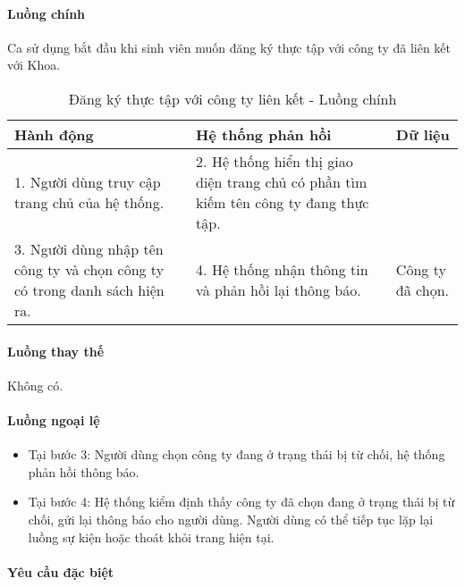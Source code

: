 \documentclass[./../main.tex]{subfiles}
\begin{document}
\paragraph*{Luồng chính} Ca sử dụng bắt đầu khi sinh viên muốn đăng ký thực tập với công ty đã liên kết với Khoa.

\begin{table}[H]
	\caption{Đăng ký thực tập với công ty liên kết - Luồng chính}
	\label{tab:register_company}
	\begin{tabularx}{\textwidth}{|X|X|X|}
		\hline
		\textbf{Hành động}                                                         & \textbf{Hệ thống phản hồi}                                                           & \textbf{Dữ liệu} \\ \hline
		1. Người dùng truy cập trang chủ của hệ thống.                             & 2. Hệ thống hiển thị giao diện trang chủ có phần tìm kiếm tên công ty đang thực tập. &                  \\ \hline
		3. Người dùng nhập tên công ty và chọn công ty có trong danh sách hiện ra. & 4. Hệ thống nhận thông tin và phản hồi lại thông báo.                                & Công ty đã chọn. \\ \hline
	\end{tabularx}
\end{table}

\paragraph*{Luồng thay thế} Không có.

\paragraph*{Luồng ngoại lệ}

\begin{itemize}
	\item
	      Tại bước 3: Người dùng chọn công ty đang ở trạng thái bị từ chối, hệ
	      thống phản hồi thông báo.
	\item

	      Tại bước 4: Hệ thống kiểm định thấy công ty đã chọn đang ở trạng thái
	      bị từ chối, gửi lại thông báo cho người dùng. Người dùng có thể tiếp
	      tục lặp lại luồng sự kiện hoặc thoát khỏi trang hiện tại.

\end{itemize}

\paragraph*{Yêu cầu đặc biệt}
\end{document}
